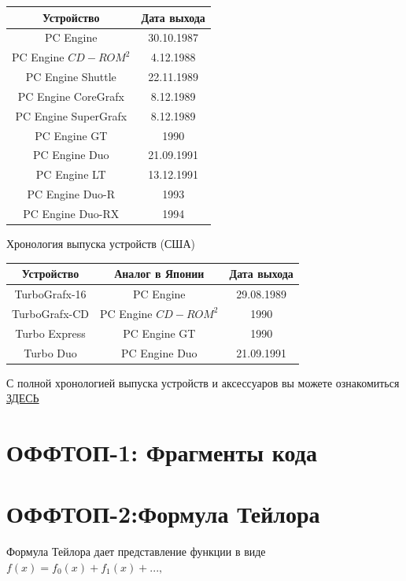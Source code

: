 \documentclass[a4paper, 12pt]{report}
\begin{document}
\begin{tabular}{|c|c|} 
 \hline
 Устройство & Дата выхода \\
 \hline \hline
 PC Engine  & 30.10.1987  \\
 \hline
 PC Engine $CD-ROM^2$ & 4.12.1988 \\
 \hline
 PC Engine Shuttle & 22.11.1989 \\
 \hline
 PC Engine CoreGrafx & 8.12.1989 \\
 \hline
 PC Engine SuperGrafx & 8.12.1989 \\
 \hline
 PC Engine GT & 1990 \\
 \hline
 PC Engine Duo & 21.09.1991 \\
 \hline
 PC Engine LT & 13.12.1991 \\
 \hline
 PC Engine Duo-R & 1993 \\
 \hline
 PC Engine Duo-RX & 1994 \\
 \hline
\end{tabular}
\newline

Хронология выпуска устройств (США)\newline

\begin{tabular}{|c c|c|} 
 \hline
 Устройство & Аналог в Японии & Дата выхода \\
 \hline \hline
 TurboGrafx-16 & PC Engine  & 29.08.1989  \\
 \hline
 TurboGrafx-CD & PC Engine $CD-ROM^2$ & 1990 \\
 \hline
 Turbo Express & PC Engine GT & 1990 \\
 \hline
 Turbo Duo & PC Engine Duo & 21.09.1991 \\
 \hline
\end{tabular}
\newline

С полной хронологией выпуска устройств и аксессуаров вы можете ознакомиться \href{https://pcengine.ru/history-of-consoles-pc-engine-turbografx-16/}{ЗДЕСЬ}

\newpage
\chapter{ОФФТОП-1: Фрагменты кода}

\newpage

\newpage
\chapter{ОФФТОП-2:Формула Тейлора}
Формула Тейлора дает представление функции в виде\newline
$f(x) = f_0(x)+f_1(x)+...,$
\end{document}

